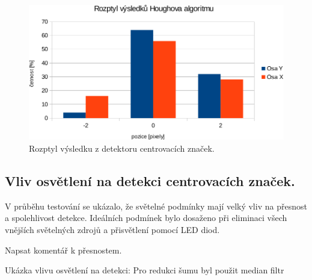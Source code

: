 \begin{figure}[H]
  \centering
    \includegraphics[width=0.9\linewidth]{pdf/hough-crop2.pdf}%
    \caption{Rozptyl výsledku z detektoru centrovacích značek.}
    \label{fig:billateralfilter}
\end{figure}



\subsection{Vliv osvětlení na detekci centrovacích značek.}
V průběhu testování se ukázalo, že světelné podmínky mají velký vliv na přesnost a spolehlivost detekce. Ideálních podmínek bylo dosaženo při eliminaci všech vnějších světelných zdrojů a přisvětlení pomocí LED diod.

Napsat komentář k přesnostem.

Ukázka vlivu osvětlení na detekci: Pro redukci šumu byl použit median filtr


